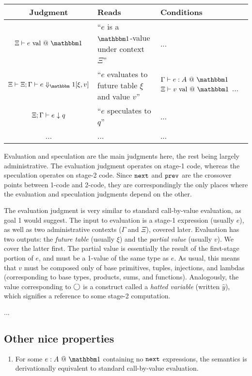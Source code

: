 \begin{center}
\begin{tabular}{|c|p{2.5cm}|p{2.5cm}|} \hline
Judgment & Reads & Conditions \\ \hline 
$\isvalone e$ & ``$e$ is a $\bbone$-value under context $\Xi$'' & ... \\ \hline 
$\Xi \vdash \diaonesub$ & ``$e$ evaluates to future table $\xi$ and value $v$'' 
& $\typesone e A$ 
	\newline $\isvalone v$ 
	\newline ... \\ \hline 
${\Xi;\Gamma} \vdash {e_{}} \downarrow {q_{}}$ & ``$e$ speculates to $q$'' & ... \\ \hline 
...&...&... \\ \hline
\end{tabular}
\end{center}

Evaluation and speculation are the main judgments here, the rest being largely administrative.  The evaluation judgment operates on stage-1 code, whereas the speculation operates on stage-2 code.  Since ${\tt next}$ and ${\tt prev}$ are the crossover points between 1-code and 2-code, they are correspondingly the only places where the evaluation and speculation judgments depend on the other. 


The evaluation judgment is very similar to standard call-by-value evaluation, as goal 1 would suggest.  The input to evaluation is a stage-1 expression (usually $e$), as well as two administrative contexts ($\Gamma$ and $\Xi$), covered later.  Evaluation has two outputs: the {\em future table} (usually $\xi$) and the {\em partial value} (usually $v$).  We cover the latter first.  The partial value is essentially the result of the first-stage portion of $e$, and must be a 1-value of the same type as $e$.  As usual, this means that $v$ must be composed only of base primitives, tuples, injections, and lambdas (corresponding to base types, products, sums, and functions).  Analogously, the value corresponding to $\bigcirc$ is a construct called a {\em hatted variable} (written $\hat y$), which signifies a reference to some stage-2 computation.  

...

\subsection{Other nice properties}

\begin{enumerate}
\item For some $\colone{e}{A}$ containing no ${\tt next}$ expressions, the semantics is derivationally equivalent to standard call-by-value evaluation.
\end{enumerate}

